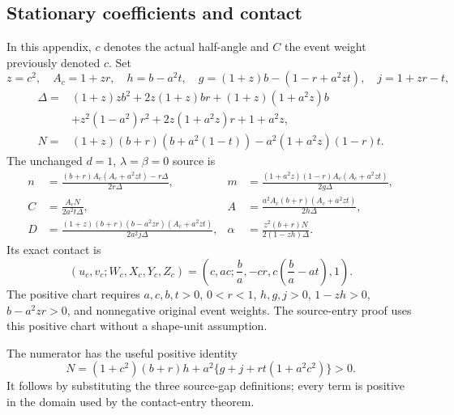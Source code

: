\subsection{Stationary coefficients and contact}\label{component:p6e5d41ed80b3}\label{app:c2-source}
In this appendix, $c$ denotes the actual half-angle and
$C$ the event weight previously denoted $c$. Set
\[
 z=c^2,\quad A_c=1+zr,\quad
 h=b-a^2t,\quad g=(1+z)b-(1-r+a^2zt),\quad j=1+zr-t,
\]
\begin{align*}
\Delta={}&(1+z)zb^2+2z(1+z)br+(1+z)(1+a^2z)b\\
 &+z^2(1-a^2)r^2+2z(1+a^2z)r+1+a^2z,\\
N={}&(1+z)(b+r)(b+a^2(1-t))-a^2(1+a^2z)(1-r)t.
\end{align*}
The unchanged $d=1$, $\lambda=\beta=0$ source is
\begin{equation}\begin{aligned}
n&=\frac{(b+r)A_c(A_c+a^2zt)-r\Delta}{2r\Delta},&
m&=\frac{(1+a^2z)(1-r)A_c(A_c+a^2zt)}{2g\Delta},\\
C&=\frac{A_cN}{2a^2t\Delta},&
A&=\frac{a^2A_c(b+r)(A_c+a^2zt)}{2h\Delta},\\
D&=\frac{(1+z)(b+r)(b-a^2zr)(A_c+a^2zt)}{2a^2j\Delta},&
\alpha&=\frac{z^2(b+r)N}{2(1-zh)\Delta}.
\end{aligned}\label{eq:c2-native-source}\end{equation}
Its exact contact is
\begin{equation}
 (u_c,v_c;W_c,X_c,Y_c,Z_c)
   =\left(c,ac;\frac ba,-cr,c\left(\frac ba-at\right),1\right).
\label{eq:c2-native-contact}\end{equation}
The positive chart requires $a,c,b,t>0$, $0<r<1$, $h,g,j>0$,
$1-zh>0$, $b-a^2zr>0$, and nonnegative original event weights.
The source-entry proof uses this positive chart without a shape-unit
assumption.

The numerator has the useful positive identity
\[
N=(1+c^2)(b+r)h+a^2\{g+j+rt(1+a^2c^2)\}>0.
\]
It follows by substituting the three source-gap definitions; every term
is positive in the domain used by the contact-entry theorem.
